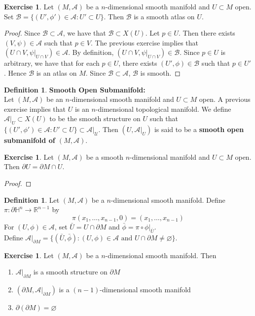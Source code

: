 \documentclass{book}
\theoremstyle{definition}
\newtheorem{defn}[definition]{Definition}
\newtheorem{ex}[definition]{Exercise}
\renewcommand{\H}{\mathbb{H}}
\newcommand{\R}{\mathbb{R}}
\newcommand{\MA}{\mathcal{A}}
\newcommand{\MB}{\mathcal{B}}
\newcommand{\MU}{\mathcal{U}}
\DeclareMathOperator*{\0}{\mbf{0}}
\DeclareMathOperator*{\1}{\mbf{1}}
\newcommand{\tbf}[1]{\textbf{#1}}
\newcommand{\p}{\partial}
\begin{document}
	\begin{ex}
		Let $(M, \MA)$ be a $n$-dimensional smooth manifold and $U \subset M$ open. Set $\MB = \{(U', \phi') \in \MA: U' \subset U\}$. Then $\MB$ is a smooth atlas on $U$.
	\end{ex}

	\begin{proof}
		Since $\MB \subset \MA$, we have that $\MB \subset X(U)$. Let $p \in U$. Then there exists $(V, \psi) \in \MA$ such that $p \in V$. The previous exercise implies that $(U \cap V, \psi|_{U \cap V}) \in \MA$. By definition, $(U \cap V, \psi|_{U \cap V}) \in \MB$. Since $p \in U$ is arbitrary, we have that for each $p \in U$, there exists $(U', \phi) \in \MB$ such that $p \in U'$. Hence $\MB$ is an atlas on $M$. Since $\MB \subset \MA$, $\MB$ is smooth. 
 	\end{proof}
 
 	\begin{defn} \textbf{Smooth Open Submanifold:} \\
 		Let $(M, \MA)$ be an $n$-dimensional smooth manifold and $U \subset M$ open. A previous exercise implies that $U$ is an $n$-dimensional topological manifold. We define $\MA|_{U} \subset X(U)$ to be the smooth structure on $U$ such that $\{(U', \phi') \in \MA: U' \subset U\} \subset \MA|_{\MU}$. Then $(U, \MA|_{U})$ is said to be a \tbf{smooth open submanifold of $(M, \MA)$}.
 	\end{defn}

	\begin{ex} 
		Let $(M, \MA)$ be a smooth $n$-dimensional manifold and $U \subset M$ open. Then $\p U = \p M \cap U$.
		
	\end{ex}

	\begin{proof}
		
	\end{proof}

	\begin{defn} 
		Let $(M, \MA)$ be a $n$-dimensional smooth manifold. Define $\pi: \p \H^n \rightarrow \R^{n-1}$ by 
		$$\pi(x_1, \ldots, x_{n-1}, 0) = (x_1, \ldots, x_{n-1})$$
		For $(U, \phi) \in \MA$, set $\bar{U} = U \cap \p M$ and $\bar{\phi} = \pi \circ \phi|_{\bar{U}}$. \\
		Define $\MA|_{\p M} = \{(\bar{U}, \bar{\phi}): (U, \phi) \in \MA \text{ and } U \cap \p M \neq \varnothing \}$.
	\end{defn}
	
	\begin{ex}
		Let $(M, \MA)$ be a $n$-dimensional smooth manifold. Then 
		\begin{enumerate}
			\item $\MA|_{\p M}$ is a smooth structure on $\p M$  
			\item $(\p M, \MA|_{\p M})$ is a $(n-1)$-dimensional smooth manifold
			\item $\partial (\partial M) = \varnothing$
		\end{enumerate}
	\end{ex}
	
\end{document}

